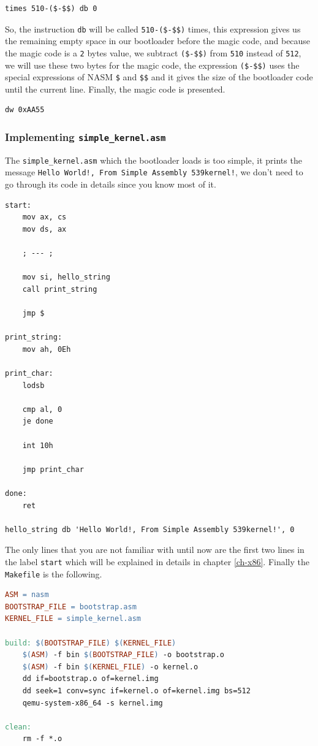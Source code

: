 \begin{lstlisting}
times 510-($-$$) db 0
\end{lstlisting}

So, the instruction \lstinline!db! will be called \lstinline!510-($-$$)!
times, this expression gives us the remaining empty space in our
bootloader before the magic code, and because the magic code is a
\lstinline!2! bytes value, we subtract \lstinline!($-$$)! from
\lstinline!510! instead of \lstinline!512!, we will use these two bytes
for the magic code, the expression \lstinline!($-$$)! uses the special
expressions of NASM \lstinline!$! and \lstinline!$$! and it gives the
size of the bootloader code until the current line. Finally, the magic
code is presented.

\begin{lstlisting}
dw 0xAA55
\end{lstlisting}

\subsubsection{\texorpdfstring{Implementing
\texttt{simple\_kernel.asm}}{Implementing simple\_kernel.asm}}\label{implementing-simple_kernel.asm}

The \lstinline!simple_kernel.asm! which the bootloader loads is too
simple, it prints the message
\lstinline"Hello World!, From Simple Assembly 539kernel!", we don't need
to go through its code in details since you know most of it.

\begin{lstlisting}
start:
    mov ax, cs
    mov ds, ax

    ; --- ;
    
    mov si, hello_string
    call print_string
    
    jmp $

print_string:
    mov ah, 0Eh

print_char:
    lodsb
    
    cmp al, 0
    je done
    
    int 10h
    
    jmp print_char

done:
    ret
    
hello_string db 'Hello World!, From Simple Assembly 539kernel!', 0
\end{lstlisting}

The only lines that you are not familiar with until now are the first
two lines in the label \lstinline!start! which will be explained in
details in chapter \ref{ch-x86}. Finally the \lstinline!Makefile! is the
following.

\begin{lstlisting}[language=make]
ASM = nasm
BOOTSTRAP_FILE = bootstrap.asm 
KERNEL_FILE = simple_kernel.asm

build: $(BOOTSTRAP_FILE) $(KERNEL_FILE)
    $(ASM) -f bin $(BOOTSTRAP_FILE) -o bootstrap.o
    $(ASM) -f bin $(KERNEL_FILE) -o kernel.o
    dd if=bootstrap.o of=kernel.img
    dd seek=1 conv=sync if=kernel.o of=kernel.img bs=512
    qemu-system-x86_64 -s kernel.img

clean:
    rm -f *.o
\end{lstlisting}

